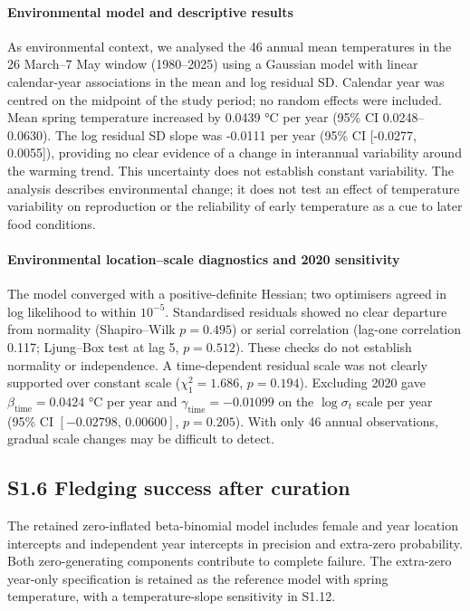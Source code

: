 \documentclass{article}
\begin{document}
\paragraph{Environmental model and descriptive results}

As environmental context, we analysed the 46 annual mean temperatures in the 26 March--7 May window (1980--2025) using a Gaussian model with linear calendar-year associations in the mean and log residual SD. Calendar year was centred on the midpoint of the study period; no random effects were included. Mean spring temperature increased by 0.0439 \si{\degreeCelsius} per year (95\% CI 0.0248--0.0630). The log residual SD slope was -0.0111 per year (95\% CI [-0.0277, 0.0055]), providing no clear evidence of a change in interannual variability around the warming trend. This uncertainty does not establish constant variability. The analysis describes environmental change; it does not test an effect of temperature variability on reproduction or the reliability of early temperature as a cue to later food conditions.

\paragraph{Environmental location--scale diagnostics and 2020 sensitivity}

The model converged with a positive-definite Hessian; two optimisers agreed in log likelihood to within $10^{-5}$. Standardised residuals showed no clear departure from normality (Shapiro--Wilk $p=0.495$) or serial correlation (lag-one correlation 0.117; Ljung--Box test at lag 5, $p=0.512$). These checks do not establish normality or independence. A time-dependent residual scale was not clearly supported over constant scale ($\chi^2_1=1.686$, $p=0.194$). Excluding 2020 gave $\beta_{\mathrm{time}}=0.0424$ \si{\degreeCelsius} per year and $\gamma_{\mathrm{time}}=-0.01099$ on the $\log\sigma_t$ scale per year (95\% CI $[-0.02798,\,0.00600]$, $p=0.205$). With only 46 annual observations, gradual scale changes may be difficult to detect.

\clearpage

\subsection{S1.6 Fledging success after curation}

The retained zero-inflated beta-binomial model includes female and year location intercepts and independent year intercepts in precision and extra-zero probability. Both zero-generating components contribute to complete failure. The extra-zero year-only specification is retained as the reference model with spring temperature, with a temperature-slope sensitivity in S1.12.
\end{document}
